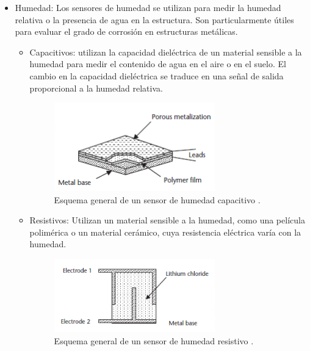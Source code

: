 \begin{itemize}
        \item Humedad: Los sensores de humedad se utilizan para medir la humedad relativa o la presencia de agua en la estructura. Son particularmente útiles para evaluar el grado de corrosión en estructuras metálicas.
        \begin{itemize}
            \item Capacitivos: utilizan la capacidad dieléctrica de un material sensible a la humedad para medir el contenido de agua en el aire o en el suelo. El cambio en la capacidad dieléctrica se traduce en una señal de salida proporcional a la humedad relativa.
            \begin{figure}[H]
                \centering
                \includegraphics[width = 0.7\textwidth]{imagenes/cap1_marcoteo/HigrometroCapacitivo.png}
                \caption{Esquema general de un sensor de humedad capacitivo \citep{dunn2005introduction}.}
                \label{fig:hig-cap}
            \end{figure}
            \item Resistivos: Utilizan un material sensible a la humedad, como una película polimérica o un material cerámico, cuya resistencia eléctrica varía con la humedad.
            \begin{figure}[H]
                \centering
                \includegraphics[width = 0.7\textwidth]{imagenes/cap1_marcoteo/HigrometroResistivo.png}
                \caption{Esquema general de un sensor de humedad resistivo \citep{dunn2005introduction}.}
                \label{fig:hig-res}
            \end{figure}

\end{itemize}
\end{itemize}
